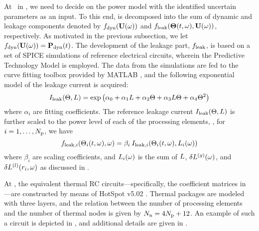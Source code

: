 At \ in , we need to decide on the power model with the identified uncertain parameters as an input. To this end,  is decomposed into the sum of dynamic and leakage components denoted by $f_{\text{dyn}}(\mathbf{U}(\omega))$ and $f_{\text{leak}}({\boldsymbol\Theta}(t, \omega), \mathbf{U}(\omega))$, respectively. As motivated in the previous subsection, we let $f_{\text{dyn}}(\mathbf{U}(\omega)) = \mathbf{P}_{\text{dyn}}(t)$. The development of the leakage part, $f_{\text{leak}}$, is based on a set of SPICE simulations of reference electrical circuits, wherein the Predictive Technology Model \cite{ptm} is employed. The data from the simulations are fed to the curve fitting toolbox provided by MATLAB \cite{matlab}, and the following exponential model of the leakage current is acquired:
\begin{equation} \elabel{leakage-current}
  I_\leak(\T, \Leff) = \exp \left( \alpha_0 + \alpha_1 \Leff + \alpha_2 \T + \alpha_3 \Leff \T + \alpha_4 \T^2 \right)
\end{equation}
where $\alpha_i$ are fitting coefficients. The reference leakage current $I_{\text{leak}}(\Theta, L)$ is further scaled to the power level of each of the processing elements, \ie, for $i = 1, \dotsc, {N_\text{p}}$, we have
\[
  f_{\text{leak}, i}(\Theta_i(t, \omega), \omega) = \beta_i \: I_{\text{leak}, i}(\Theta_i(t, \omega), L_i(\omega))
\]
where $\beta_i$ are scaling coefficients, and $L_i(\omega)$ is the sum of $L$, ${\delta L^{(g)}}(\omega)$, and $\delta L^{(l)}(r_i, \omega)$ as discussed in .

At , the equivalent thermal RC circuits---specifically, the coefficient matrices in ---are constructed by means of HotSpot v5.02 \cite{hotspot}. Thermal packages are modeled with three layers, and the relation between the number of processing elements and the number of thermal nodes is given by $N_\text{n} = 4 {N_\text{p}} + 12$. An example of such a circuit is depicted in , and additional details are given in .
